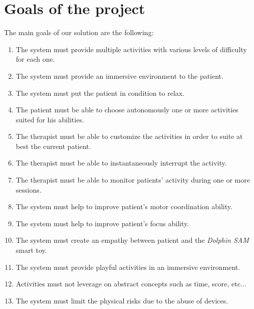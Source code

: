 \section{Goals of the project}
The main goals of our solution are the following:
\begin{enumerate}
	\item The system must provide multiple activities with various levels of difficulty for each one.
	\item The system must provide an immersive environment to the patient. 
	\item The system must put the patient in condition to relax.
	\item The patient must be able to choose autonomously one or more activities suited for his abilities.
	\item The therapist must be able to customize the activities in order to suite at best the current patient.
	\item The therapist must be able to instantaneously interrupt the activity.
	\item The therapist must be able to monitor patients’ activity during one or more sessions.
	\item The system must help to improve patient’s motor coordination ability.
	\item The system must help to improve patient’s focus ability.
	\item The system must create an empathy between patient and the \textit{Dolphin SAM} smart toy.
	\item The system must provide playful activities in an immersive environment.
	\item Activities must not leverage on abstract concepts such as time, score, etc...
	\item The system must limit the physical risks due to the abuse of devices.
\end{enumerate}
